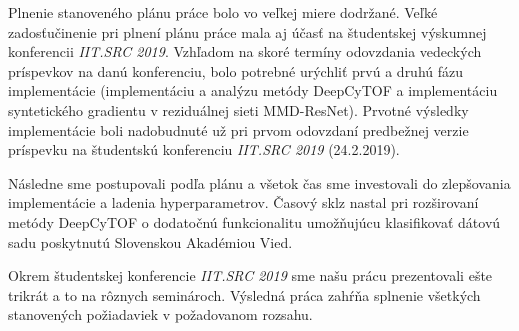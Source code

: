 Plnenie stanoveného plánu práce bolo vo veľkej miere dodržané. Veľké zadosťučinenie pri plnení plánu práce mala aj účasť na študentskej výskumnej konferencii \textit{IIT.SRC 2019}. Vzhľadom na skoré termíny odovzdania vedeckých príspevkov na danú konferenciu, bolo potrebné urýchliť prvú a druhú fázu implementácie (implementáciu a analýzu metódy DeepCyTOF a implementáciu syntetického gradientu v reziduálnej sieti MMD-ResNet). Prvotné výsledky implementácie boli nadobudnuté už pri prvom odovzdaní predbežnej verzie príspevku na študentskú konferenciu \textit{IIT.SRC 2019} (24.2.2019). 

Následne sme postupovali podľa plánu a všetok čas sme investovali do zlepšovania implementácie a ladenia hyperparametrov. Časový sklz nastal pri rozširovaní metódy DeepCyTOF o dodatočnú funkcionalitu umožňujúcu klasifikovať dátovú sadu poskytnutú Slovenskou Akadémiou Vied.

Okrem študentskej konferencie \textit{IIT.SRC 2019} sme našu prácu prezentovali ešte trikrát a to na rôznych seminároch. Výsledná práca zahŕňa splnenie všetkých stanovených požiadaviek v požadovanom rozsahu.